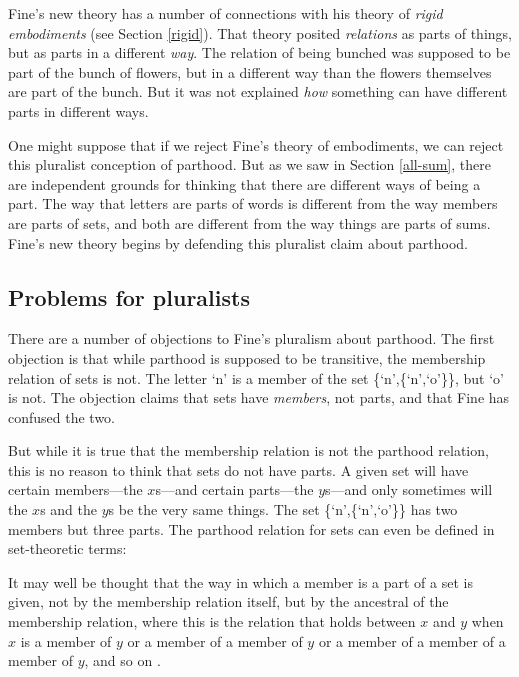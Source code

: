 \documentclass[11pt]{article}
\newenvironment{squote}{%
\begin{spacing}{1}
\begin{list}{}{%
\setlength{\labelwidth}{0pt}%
\rightmargin\leftmargin%
}
\item\relax
}{%
\end{list}%
\end{spacing}
}
\begin{document}
\begin{spacing}{1.5}
Fine's new theory has a number of connections with his theory of {\em
  rigid embodiments} (see Section \ref{rigid}).  That theory posited
{\em relations} as parts of things, but as parts in a different {\em
  way}.  The relation of being bunched was supposed to be part of the
bunch of flowers, but in a different way than the flowers themselves
are part of the bunch.  But it was not explained {\em how} something
can have different parts in different ways.  

One might suppose that if we reject Fine's theory of embodiments, we
can reject this pluralist conception of parthood.  But as we saw in
Section \ref{all-sum}, there are independent grounds for thinking that
there are different ways of being a part.  The way that letters are
parts of words is different from the way members are parts of sets,
and both are different from the way things are parts of sums.  Fine's
new theory begins by defending this pluralist claim about parthood.

\subsection{Problems for pluralists}
\label{sets}
There are a number of objections to Fine's pluralism about parthood.
The first objection is that while parthood is supposed to be
transitive, the membership relation of sets is not.  The letter `n' is
a member of the set \{`n',\{`n',`o'\}\}, but `o' is not.  The
objection claims that sets have {\em members}, not parts, and that
Fine has confused the two.

But while it is true that the membership relation is not the parthood
relation, this is no reason to think that sets do not have parts.  A
given set will have certain members---the $x$s---and certain
parts---the $y$s---and only sometimes will the $x$s and the $y$s be
the very same things.  The set \{`n',\{`n',`o'\}\} has two members
but three parts.  The parthood relation for sets can even be defined
in set-theoretic terms:

\begin{squote}
It may well be thought that the way in which a member is a part of a
set is given, not by the membership relation itself, but by the
ancestral of the membership relation, where this is the relation that
holds between $x$ and $y$ when $x$ is a member of $y$ or a member of a
member of $y$ or a member of a member of a member of $y$, and so on
\citep[563]{fine2010}.
\end{squote}


\end{spacing}
\end{document}
